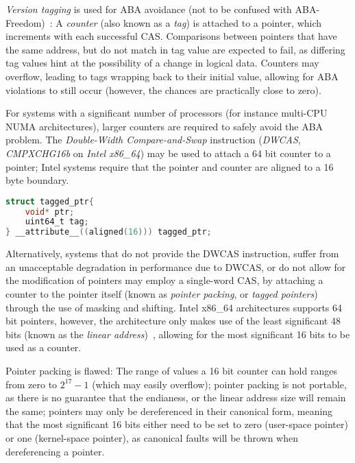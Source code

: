 \emph{Version tagging} is used for ABA avoidance (not to be confused with
ABA-Freedom)~\citep{dechev2010understanding}:
A \emph{counter} (also known as a \emph{tag}) is attached to a pointer, which increments with
each successful CAS. Comparisons between pointers that have the same address,
but do not match in tag value are expected to fail, as differing tag values hint
at the possibility of a change in logical data. Counters may overflow, leading to tags wrapping back
to their initial value, allowing for ABA violations to still occur (however,
the chances are practically close to zero).

For systems with a significant number of processors (for instance multi-CPU NUMA
architectures), larger counters are required  to safely avoid the ABA problem.
The \emph{Double-Width Compare-and-Swap} instruction (\emph{DWCAS}, \emph{CMPXCHG16b} on
\emph{Intel x86\_64}) may be used to attach a 64 bit counter to a pointer; Intel
systems require that the pointer and counter are aligned to a 16 byte boundary.

\begin{lstlisting}[language=C,caption={Struct aligned to 16 bytes, as required by the DWCAS instruction.}]
struct tagged_ptr{
    void* ptr;
    uint64_t tag;
} __attribute__((aligned(16))) tagged_ptr;
\end{lstlisting}

Alternatively, systems that do not provide the DWCAS instruction, suffer from
an unacceptable degradation in performance due to DWCAS, or do not allow for
the modification of pointers may employ a single-word CAS, by attaching a
counter to the pointer itself (known as \emph{pointer packing}, or \emph{tagged
pointers}) through the use of masking and shifting. Intel x86\_64 architectures supports 64 bit pointers, however, the
architecture only makes use of the least significant 48 bits (known as the
\emph{linear address})~\citep[Section~3.3.7.1]{intel2021system}, allowing for
the most significant 16 bits to be used as a counter.

Pointer packing is flawed: The range of values a 16 bit counter can hold ranges
from zero to $2^{17}-1$ (which may easily overflow); pointer packing is not
portable, as there is no guarantee that the endianess, or the linear address
size will remain the same; pointers may only be dereferenced in their canonical
form, meaning that the most significant 16 bits either need to be set to zero
(user-space pointer) or one (kernel-space pointer), as canonical faults will be
thrown when dereferencing a pointer.


